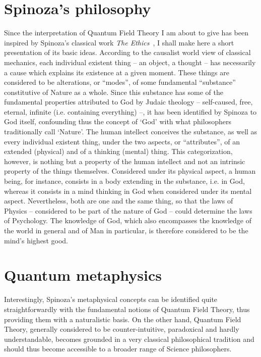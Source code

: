 \documentclass[10pt,a4paper,twoside,openany]{book}
\begin{document}
\section{Spinoza's philosophy}

Since the interpretation of Quantum Field Theory I am about to give has been inspired by Spinoza's classical work \textit{The Ethics}~\cite{Spinoza1677}, I shall make here a short presentation of its basic ideas. According to the causalist world view of classical mechanics, each individual existent thing -- an object, a thought -- has necessarily a cause which explains its existence at a given moment. These things are considered to be alterations, or ``modes'', of some fundamental ``substance'' constitutive of Nature as a whole. Since this substance has some of the fundamental properties attributed to God by Judaic theology -- self-caused, free, eternal, infinite (i.e. containing everything) --, it has been identified by Spinoza to God itself, confounding thus the concept of `God' with what philosophers traditionally call `Nature'. The human intellect conceives the substance, as well as every individual existent thing, under the two aspects, or ``attributes'', of an extended (physical) and of a thinking (mental) thing. This categorization, however, is nothing but a property of the human intellect and not an intrinsic property of the things themselves. Considered under its physical aspect, a human being, for instance, consists in a body extending in the substance, i.e. in God, whereas it consists in a mind thinking in God when considered under its mental aspect. Nevertheless, both are one and the same thing, so that the laws of Physics -- considered to be part of the nature of God -- could determine the laws of Psychology. The knowledge of God, which also encompasses the knowledge of the world in general and of Man in particular, is therefore considered to be the mind's highest good.

\section{Quantum metaphysics}

Interestingly, Spinoza's metaphysical concepts can be identified quite straightforwardly with the fundamental notions of Quantum Field Theory, thus providing them with a naturalistic basis. On the other hand, Quantum Field Theory, generally considered to be counter-intuitive, paradoxical and hardly understandable, becomes grounded in a very classical philosophical tradition and should thus become accessible to a broader range of Science philosophers.
\end{document}
